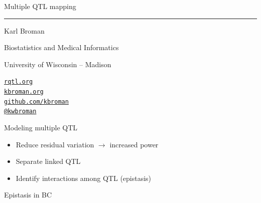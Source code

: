 \documentclass[12pt]{article}
\newcommand{\titlesize}{\fontsize{40}{50} \selectfont}
\newcommand{\headsize}{\fontsize{35}{35} \selectfont}
\newcommand{\textsize}{\fontsize{30}{35} \selectfont}
\newcommand{\smallsize}{\fontsize{25}{30} \selectfont}
\begin{document}
\thispagestyle{empty}

\begin{center}
\titlesize \color{myyellow}


\vspace*{15mm}

Multiple QTL mapping

\color{mypink}
\rule{10in}{1mm}

\vspace{5mm}

\textsize \color{myblue}
Karl Broman
\vspace{5mm}

\color{mywhite}
{\smallsize Biostatistics and Medical Informatics

University of Wisconsin -- Madison
\vspace{20mm}


\href{http://rqtl.org}{\tt rqtl.org} \\[3pt]
\href{https://kbroman.org}{\tt kbroman.org} \\[3pt]
\href{https://github.com/kbroman}{\tt github.com/kbroman} \\
\href{https://twitter.com/kwbroman}{\tt @kwbroman}
}

\end{center}

\newpage

\headsize \color{myyellow}
\hfill \begin{minipage}{5.75in}
\centering
Modeling multiple QTL
\end{minipage}

\vspace{3cm}

\color{mywhite} \smallsize

\hfill \begin{minipage}[t]{10in}
\begin{itemize}
\itemsep24pt
\item Reduce residual variation $\longrightarrow$ increased power

\item Separate linked QTL

\item Identify interactions among QTL {\color{myblue} (epistasis)}

\end{itemize}
\end{minipage}


\newpage

\headsize \color{myyellow}
\hfill \begin{minipage}{5.75in}
\centering
Epistasis in BC
\end{minipage}
\end{document}

